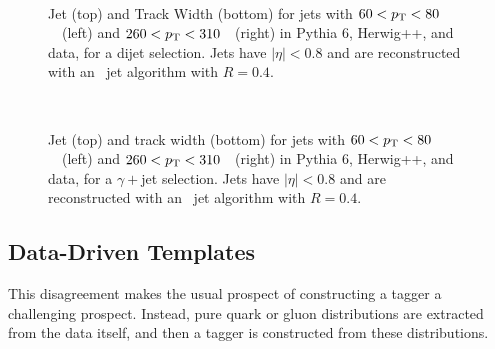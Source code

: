 \begin{figure}[tbp]
\begin{center}
 \\
\caption{
Jet \ntrk (top) and Track Width (bottom) for jets with $60<p_{\text{T}}<80$~\GeV\ (left) and
$260<p_{\text{T}}<310$~\GeV\ (right) in {\sc Pythia} 6, {\sc Herwig++}, and data, for a dijet selection.
Jets have $|\eta|<0.8$ and are reconstructed with an \AKT\ jet algorithm with $R=0.4$.
 }
\label{fig:jet-reconstruction:qg:dijetProperties}
\end{center}
\end{figure}

\begin{figure}[tbp]
\begin{center}
 \\
\caption{
Jet \ntrk (top) and track width (bottom) for jets with $60<p_{\text{T}}<80$~\GeV\ (left) and
$260<p_{\text{T}}<310$~\GeV\ (right) in {\sc Pythia} 6, {\sc Herwig++}, and data, for a $\gamma+$jet selection.
Jets have $|\eta|<0.8$ and are reconstructed with an \AKT\ jet algorithm with $R=0.4$.
 }
\label{fig:jet-reconstruction:qg:gammajetProperties}
\end{center}
\end{figure}

\subsection{Data-Driven Templates}

This disagreement makes the usual prospect of constructing a tagger a challenging prospect. Instead, pure quark or gluon distributions are extracted from the data itself, and then a tagger is constructed from these distributions. 

